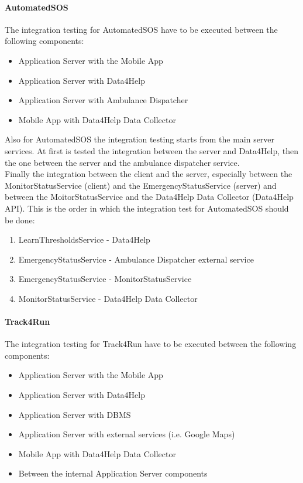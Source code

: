 \documentclass[a4paper]{article}
\begin{document}
\paragraph{AutomatedSOS}
The integration testing for AutomatedSOS have to be executed between the following components:
\begin{itemize}
    \item Application Server with the Mobile App
    \item Application Server with Data4Help
    \item Application Server with Ambulance Dispatcher
    \item Mobile App with Data4Help Data Collector
\end{itemize}

\noindent Also for AutomatedSOS the integration testing starts from the main server services. At first is tested the integration between the server and Data4Help, then the one between the server and the ambulance dispatcher service.\\
Finally the integration between the client and the server, especially between the MonitorStatusService (client) and the EmergencyStatusService (server) and between the MoitorStatusService and the Data4Help Data Collector (Data4Help API).
\newline\newline This is the order in which the integration test for AutomatedSOS should be done:

\begin{enumerate}[label*=\bf{\arabic*} . ]
    \item LearnThresholdsService - Data4Help
    \item EmergencyStatusService - Ambulance Dispatcher external service
    \item EmergencyStatusService - MonitorStatusService
    \item MonitorStatusService - Data4Help Data Collector
\end{enumerate}

\paragraph{Track4Run}
The integration testing for Track4Run have to be executed between the following components:

\begin{itemize}
    \item Application Server with the Mobile App
    \item Application Server with Data4Help
    \item Application Server with DBMS
    \item Application Server with external services (i.e. Google Maps)
    \item Mobile App with Data4Help Data Collector
    \item Between the internal Application Server components
\end{itemize}
\end{document}
